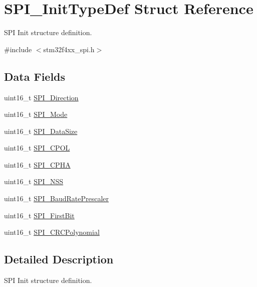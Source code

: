 \hypertarget{struct_s_p_i___init_type_def}{\section{S\-P\-I\-\_\-\-Init\-Type\-Def Struct Reference}
\label{struct_s_p_i___init_type_def}
}


S\-P\-I Init structure definition.  




{\ttfamily \#include $<$stm32f4xx\-\_\-spi.\-h$>$}

\subsection*{Data Fields}
\begin{DoxyCompactItemize}
\item 
uint16\-\_\-t \hyperlink{struct_s_p_i___init_type_def_a485dbba7798a7ff3d00dfabba19584b8}{S\-P\-I\-\_\-\-Direction}
\item 
uint16\-\_\-t \hyperlink{struct_s_p_i___init_type_def_aeddd33e224d56672843782c105ed82e4}{S\-P\-I\-\_\-\-Mode}
\item 
uint16\-\_\-t \hyperlink{struct_s_p_i___init_type_def_a541e4cbd533e4102ffeffbe8388a38d6}{S\-P\-I\-\_\-\-Data\-Size}
\item 
uint16\-\_\-t \hyperlink{struct_s_p_i___init_type_def_ae8d27aca088402c07e34e5a2ab4902d9}{S\-P\-I\-\_\-\-C\-P\-O\-L}
\item 
uint16\-\_\-t \hyperlink{struct_s_p_i___init_type_def_a120f808113ce7d69e2ec1ea65abed627}{S\-P\-I\-\_\-\-C\-P\-H\-A}
\item 
uint16\-\_\-t \hyperlink{struct_s_p_i___init_type_def_a046014c02b6456fd153ea81077e42ab6}{S\-P\-I\-\_\-\-N\-S\-S}
\item 
uint16\-\_\-t \hyperlink{struct_s_p_i___init_type_def_a35b348a0ba5d3e9a8bc907a7ebe10d13}{S\-P\-I\-\_\-\-Baud\-Rate\-Prescaler}
\item 
uint16\-\_\-t \hyperlink{struct_s_p_i___init_type_def_a5e5761d0b588ff75ad15adb2adf9e7e7}{S\-P\-I\-\_\-\-First\-Bit}
\item 
uint16\-\_\-t \hyperlink{struct_s_p_i___init_type_def_a1f0b3ef1e0062883db3ea3ef5690d0c2}{S\-P\-I\-\_\-\-C\-R\-C\-Polynomial}
\end{DoxyCompactItemize}


\subsection{Detailed Description}
S\-P\-I Init structure definition. 

